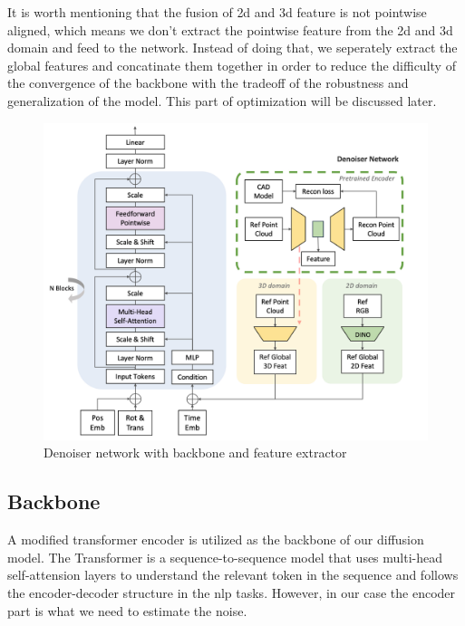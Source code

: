 \documentclass[12pt,DIV14,BCOR12mm,a4paper,footinclude=false,headinclude,parskip=half-,twoside,openright,cleardoublepage=empty,toc=index,bibliography=totoc,listof=totoc]{scrreprt}
\numberwithin{equation}{chapter}
\begin{document}
It is worth mentioning that the fusion of \gls{2d} and \gls{3d} feature is not pointwise aligned, which means we don't extract the pointwise feature from the \gls{2d} and \gls{3d} domain and feed to the network. Instead of doing that, we seperately extract the global features and concatinate them together in order to reduce the difficulty of the convergence of the backbone with the tradeoff of the robustness and generalization of the model. This part of optimization will be discussed later.
\begin{figure}[h]
	\centering
	\includegraphics[scale=.30]{img/denoiser.png}
	\caption{Denoiser network with backbone and feature extractor}
	\label{img:denoiser}
\end{figure}

\subsection{Backbone}
A modified transformer encoder is utilized as the backbone of our diffusion model. The Transformer\cite{vaswani2023attention} is a sequence-to-sequence model that uses multi-head self-attension layers to understand the relevant token in the sequence and follows the encoder-decoder structure in the \gls{nlp} tasks. However, in our case the encoder part is what we need to estimate the noise.
\end{document}
